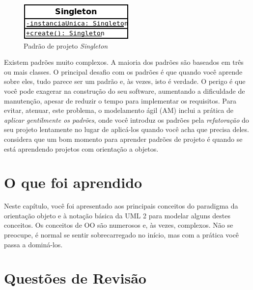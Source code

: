 \begin{figure}
\begin{center}
\includegraphics[scale=0.7]{singleton.png}
\end{center}
\caption{Padrão de projeto \emph{Singleton}} \label{fig:singleton}
\end{figure}

Existem padrões muito complexos. A maioria dos padrões são baseados em três ou mais classes. O principal desafio com os padrões é que quando você aprende sobre eles, tudo parece ser um padrão e, às vezes, isto é verdade. O perigo é que você pode exagerar na construção do seu software, aumentando a dificuldade de manutenção, apesar de reduzir o tempo para implementar os requisitos. Para evitar, atenuar, este problema, o modelamento ágil (AM) inclui a prática de \emph{aplicar gentilmente os padrões}, onde você introduz os padrões pela \emph{refatoração} do seu projeto lentamente no lugar de aplicá-los quando você acha que precisa deles.
\cite{DP:explained} considera que um bom momento para aprender padrões de projeto é quando se está aprendendo projetos com orientação a objetos.

\section{O que foi aprendido}

Neste capítulo, você foi apresentado aos principais conceitos do paradigma da orientação objeto e à notação básica da UML 2 para modelar alguns destes conceitos. Os conceitos de OO são numerosos e, às vezes, complexos. Não se preocupe, é normal se sentir sobrecarregado no início, mas com a prática você passa a dominá-los. 

\section{Questões de Revisão}

